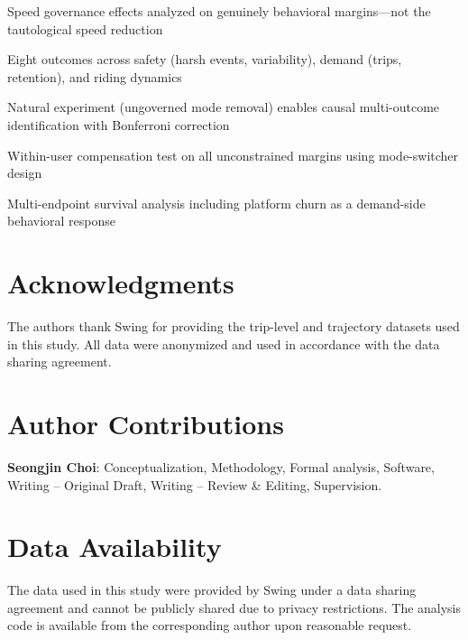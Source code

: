 \documentclass[a4paper,fleqn]{cas-sc}
\begin{document}
\begin{highlights}
\item Speed governance effects analyzed on genuinely behavioral margins---not the tautological speed reduction
\item Eight outcomes across safety (harsh events, variability), demand (trips, retention), and riding dynamics
\item Natural experiment (ungoverned mode removal) enables causal multi-outcome identification with Bonferroni correction
\item Within-user compensation test on all unconstrained margins using mode-switcher design
\item Multi-endpoint survival analysis including platform churn as a demand-side behavioral response
\end{highlights}

\maketitle











\section*{Acknowledgments}
The authors thank Swing for providing the trip-level and trajectory datasets used in this study. All data were anonymized and used in accordance with the data sharing agreement.

\section*{Author Contributions}
\textbf{Seongjin Choi}: Conceptualization, Methodology, Formal analysis, Software, Writing -- Original Draft, Writing -- Review \& Editing, Supervision.

\section*{Data Availability}
The data used in this study were provided by Swing under a data sharing agreement and cannot be publicly shared due to privacy restrictions. The analysis code is available from the corresponding author upon reasonable request.



\end{document}
